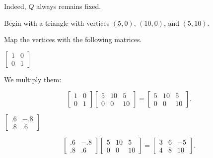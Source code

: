 \documentclass[../key.tex]{subfiles}
\begin{document}
Indeed, $Q$ always remains fixed.

\begin{outer_problem}
\item Begin with a triangle with vertices $(5,0)$, $(10,0)$, and $(5,10)$.
\end{outer_problem}

\begin{inner_problem}[start=1]
\item Map the vertices with the following matrices.
\end{inner_problem}

\begin{iinner_problem}[start=1]
\item $\left[\begin{array}{cc}1 & 0 \\ 0 & 1 \end{array}\right]$
\end{iinner_problem}

We multiply them:

$$\begin{bmatrix} 1 & 0 \\ 0 & 1 \end{bmatrix} \begin{bmatrix} 5 & 10 & 5 \\ 0 & 0 & 10 \end{bmatrix} = \begin{bmatrix} 5 & 10 & 5 \\ 0 & 0 & 10 \end{bmatrix}.$$

\begin{iinner_problem}
\item $\left[\begin{array}{cc}.6 & -.8 \\ .8 & .6 \end{array}\right]$
\end{iinner_problem}

$$\begin{bmatrix} .6 & -.8 \\ .8 & .6 \end{bmatrix} \begin{bmatrix} 5 & 10 & 5 \\ 0 & 0 & 10 \end{bmatrix} = \begin{bmatrix} 3 & 6 & -5 \\ 4 & 8 & 10 \end{bmatrix}.$$
\end{document}
